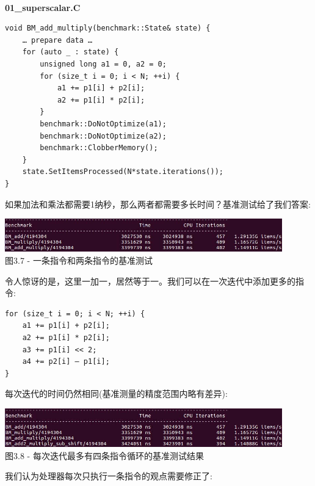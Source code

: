 \hspace*{\fill} \\ %
\noindent
\textbf{01\_superscalar.C}
\begin{lstlisting}[style=styleCXX]
void BM_add_multiply(benchmark::State& state) {
	… prepare data …
	for (auto _ : state) {
		unsigned long a1 = 0, a2 = 0;
		for (size_t i = 0; i < N; ++i) {
			a1 += p1[i] + p2[i];
			a2 += p1[i] * p2[i];
		}
		benchmark::DoNotOptimize(a1);
		benchmark::DoNotOptimize(a2);
		benchmark::ClobberMemory();
	}
	state.SetItemsProcessed(N*state.iterations());
}
\end{lstlisting}

如果加法和乘法都需要1纳秒，那么两者都需要多长时间？基准测试给了我们答案:

\begin{center}
\includegraphics[width=0.9\textwidth]{content/1/chapter3/images/7.jpg}\\
图3.7 - 一条指令和两条指令的基准测试
\end{center}

令人惊讶的是，这里一加一，居然等于一。我们可以在一次迭代中添加更多的指令:

\begin{lstlisting}[style=styleCXX]
for (size_t i = 0; i < N; ++i) {
	a1 += p1[i] + p2[i];
	a2 += p1[i] * p2[i];
	a3 += p1[i] << 2;
	a4 += p2[i] – p1[i];
}
\end{lstlisting}

每次迭代的时间仍然相同(基准测量的精度范围内略有差异):

\begin{center}
\includegraphics[width=0.9\textwidth]{content/1/chapter3/images/8.jpg}\\
图3.8 - 每次迭代最多有四条指令循环的基准测试结果
\end{center}

我们认为处理器每次只执行一条指令的观点需要修正了:

